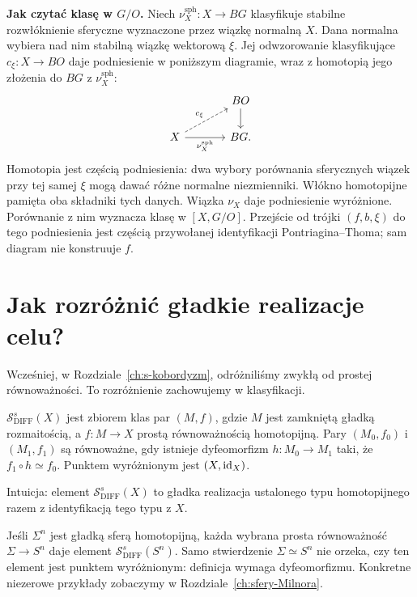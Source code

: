 \noindent\textbf{Jak czytać klasę w $G/O$.}
Niech $\nu_X^{\mathrm{sph}}:X\to BG$ klasyfikuje
stabilne rozwłóknienie sferyczne wyznaczone
przez wiązkę normalną $X$.
Dana normalna wybiera nad nim stabilną
wiązkę wektorową $\xi$. Jej odwzorowanie
klasyfikujące $c_\xi:X\to BO$ daje
podniesienie w poniższym diagramie,
wraz z homotopią
jego złożenia do $BG$ z $\nu_X^{\mathrm{sph}}$:
\[
\begin{tikzcd}[column sep=large]
 & BO \arrow[d] \\
 X \arrow[ur,dashed,"c_\xi"]
   \arrow[r,"\nu_X^{\mathrm{sph}}"'] & BG .
\end{tikzcd}
\]
Homotopia jest częścią podniesienia: dwa wybory
porównania sferycznych wiązek przy tej samej $\xi$
mogą dawać różne normalne niezmienniki. Włókno
homotopijne pamięta oba składniki tych danych.
Wiązka $\nu_X$ daje podniesienie wyróżnione.
Porównanie z nim wyznacza klasę w $[X,G/O]$.
Przejście od trójki $(f,b,\xi)$ do tego
podniesienia jest częścią przywołanej
identyfikacji Pontriagina--Thoma;
sam diagram nie konstruuje $f$.

\section{Jak rozróżnić gładkie realizacje celu?}
\label{sec:zbior-struktur-23}

Wcześniej, w Rozdziale~\ref{ch:s-kobordyzm},
odróżniliśmy zwykłą od prostej równoważności.
To rozróżnienie zachowujemy w klasyfikacji.

\begin{definicja}
\label{def:structure-set-23}
$\mathcal S^s_{\mathrm{DIFF}}(X)$ jest zbiorem
klas par $(M,f)$, gdzie $M$ jest zamkniętą
gładką rozmaitością, a $f:M\to X$ prostą
równoważnością homotopijną. Pary $(M_0,f_0)$
i $(M_1,f_1)$ są równoważne, gdy istnieje
dyfeomorfizm $h:M_0\to M_1$ taki, że
$f_1\circ h\simeq f_0$. Punktem wyróżnionym
jest $(X,\mathrm{id}_X)$.
\end{definicja}

Intuicja: element $\mathcal S^s_{\mathrm{DIFF}}(X)$
to gładka realizacja ustalonego typu homotopijnego
razem z identyfikacją tego typu z $X$.

\begin{przyklad}
\label{prz:struktury-sfera-23}
Jeśli $\Sigma^n$ jest gładką sferą homotopijną,
każda wybrana prosta równoważność
$\Sigma\to S^n$ daje element
$\mathcal S^s_{\mathrm{DIFF}}(S^n)$.
Samo stwierdzenie $\Sigma\simeq S^n$
nie orzeka, czy ten element jest punktem
wyróżnionym: definicja wymaga dyfeomorfizmu.
Konkretne niezerowe przykłady zobaczymy
w Rozdziale~\ref{ch:sfery-Milnora}.
\end{przyklad}

